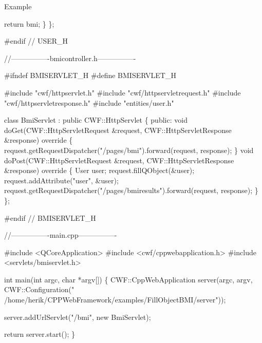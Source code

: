 \begin{DoxyParagraph}{Example}
\begin{DoxyCode}
        \textcolor{keywordflow}{return} bmi;
    \}
\};

\textcolor{preprocessor}{#endif // USER\_H}

\textcolor{comment}{//----------------bmicontroller.h----------------}

\textcolor{preprocessor}{#ifndef BMISERVLET\_H}
\textcolor{preprocessor}{#define BMISERVLET\_H}

\textcolor{preprocessor}{#include "cwf/httpservlet.h"}
\textcolor{preprocessor}{#include "cwf/httpservletrequest.h"}
\textcolor{preprocessor}{#include "cwf/httpservletresponse.h"}
\textcolor{preprocessor}{#include "entities/user.h"}

\textcolor{keyword}{class }BmiServlet : \textcolor{keyword}{public} CWF::HttpServlet
\{
\textcolor{keyword}{public}:
    \textcolor{keywordtype}{void} doGet(CWF::HttpServletRequest &request, CWF::HttpServletResponse &response)\textcolor{keyword}{ override}
\textcolor{keyword}{    }\{
        request.getRequestDispatcher(\textcolor{stringliteral}{"/pages/bmi"}).forward(request, response);
    \}
    \textcolor{keywordtype}{void} doPost(CWF::HttpServletRequest &request, CWF::HttpServletResponse &response)\textcolor{keyword}{ override}
\textcolor{keyword}{    }\{
        User user;
        request.fillQObject(&user);
        request.addAttribute(\textcolor{stringliteral}{"user"}, &user);
        request.getRequestDispatcher(\textcolor{stringliteral}{"/pages/bmiresults"}).forward(request, response);
    \}
\};

\textcolor{preprocessor}{#endif // BMISERVLET\_H}

\textcolor{comment}{//----------------main.cpp----------------}

\textcolor{preprocessor}{#include <QCoreApplication>}
\textcolor{preprocessor}{#include <cwf/cppwebapplication.h>}
\textcolor{preprocessor}{#include <servlets/bmiservlet.h>}

\textcolor{keywordtype}{int} main(\textcolor{keywordtype}{int} argc, \textcolor{keywordtype}{char} *argv[])
\{
    CWF::CppWebApplication server(argc,
                                  argv,
                                  CWF::Configuration(\textcolor{stringliteral}{"
      /home/herik/CPPWebFramework/examples/FillObjectBMI/server"}));

    server.addUrlServlet(\textcolor{stringliteral}{"/bmi"}, \textcolor{keyword}{new} BmiServlet);

    \textcolor{keywordflow}{return} server.start();
\}
\end{DoxyCode}
 
\end{DoxyParagraph}
\mbox{\label{class_http_servlet_request_a6325279882fc5a910951b6ccec6ebb25}} 
